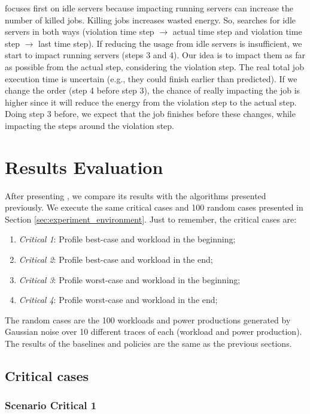 \emph{\systemName} focuses first on idle servers because impacting running servers can increase the number of killed jobs. Killing jobs increases wasted energy. So, \emph{\systemName} searches for idle servers in both ways (violation time step $\rightarrow$ actual time step and violation time step $\rightarrow$ last time step). If reducing the usage from idle servers is insufficient, we start to impact running servers (steps 3 and 4). Our idea is to impact them as far as possible from the actual step, considering the violation step. The real total job execution time is uncertain (e.g., they could finish earlier than predicted). If we change the order (step 4 before step 3), the chance of really impacting the job is higher since it will reduce the energy from the violation step to the actual step. Doing step 3 before, we expect that the job finishes before these changes, while impacting the steps around the violation step. 

\section{Results Evaluation}

After presenting \emph{\systemName}, we compare its results with the algorithms presented previously. We execute the same critical cases and 100 random cases presented in Section \ref{sec:experiment_environment}. Just to remember, the critical cases are:
\begin{enumerate}
    \item \emph{Critical 1}: Profile best-case and workload in the beginning;
    \item \emph{Critical 2}: Profile best-case and workload in the end;
    \item \emph{Critical 3}: Profile worst-case and workload in the beginning;
    \item \emph{Critical 4}: Profile worst-case and workload in the end;
\end{enumerate}

The random cases are the 100 workloads and power productions generated by Gaussian noise over 10 different traces of each (workload and power production). The results of the baselines and policies are the same as the previous sections.

\subsection{Critical cases}

\subsubsection{Scenario Critical 1}

